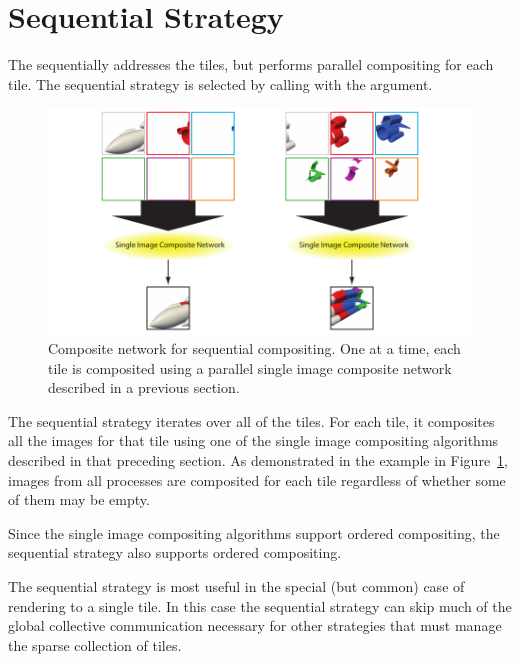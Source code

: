 \section{Sequential Strategy}
\label{sec:Strategies:Sequential}


The  sequentially addresses the tiles, but
performs parallel compositing for each tile.  The sequential strategy is
selected by calling  with the
 argument.

\begin{figure}
  \centering
  \includegraphics{images/SequentialComposite}
  \caption[Sequential compositing network.]{Composite network for
    sequential compositing.  One at a time, each tile is composited using a
    parallel single image composite network described in a previous
    section.}
  \label{fig:SequentialComposite}
\end{figure}

The sequential strategy iterates over all of the tiles.  For each tile, it
composites all the images for that tile using one of the single image
compositing algorithms described in that preceding section.  As
demonstrated in the example in Figure~\ref{fig:SequentialComposite}, images
from all processes are composited for each tile regardless of whether some
of them may be empty.

Since the single image compositing algorithms support ordered
compositing, the sequential strategy also supports ordered compositing.

The sequential strategy is most useful in the special (but common) case of
rendering to a single tile.  In this case the sequential strategy can skip
much of the global collective communication necessary for other strategies
that must manage the sparse collection of tiles.


